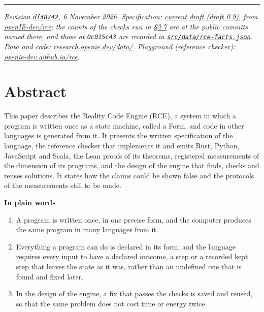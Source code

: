 \documentclass[10pt,letterpaper]{article}
\providecommand{\tightlist}{\setlength{\itemsep}{1pt}\setlength{\parskip}{0pt}}
\begin{document}
{
\small
\setcounter{tocdepth}{2}
\tableofcontents
}
\vspace{4pt}
\hrule
\vspace{8pt}

\emph{Revision
\href{https://github.com/openIE-dev/research-openie-web/commits/main/src/content/papers/rce.md}{\texttt{df38742}},
6 November 2026. Specification:
\href{https://research.openie.dev/rce/spec/}{current draft (draft 0.9)},
from \href{https://github.com/openIE-dev/rce}{openIE-dev/rce}; the
counts of the checks run in
\href{https://research.openie.dev/papers/rce/\#37-the-language-one-text-costs-and-theorem-status}{§3.7}
are at the public commits named there, and those at \texttt{0c015c43}
are recorded in
\href{https://github.com/openIE-dev/research-openie-web/blob/main/src/data/rce-facts.json}{\texttt{src/\allowbreak{}data/\allowbreak{}rce-\allowbreak{}facts.\allowbreak{}json}}.
Data and code:
\href{https://research.openie.dev/data/\#rce}{research.openie.dev/data/}.
Playground (reference checker):
\href{https://openie-dev.github.io/rce/}{openie-dev.github.io/rce}.}

\section{Abstract}\label{abstract}

This paper describes the Reality Code Engine (RCE), a system in which a
program is written once as a state machine, called a Form, and code in
other languages is generated from it. It presents the written
specification of the language, the reference checker that implements it
and emits Rust, Python, JavaScript and Scala, the Lean proofs of its
theorems, registered measurements of the dimension of its programs, and
the design of the engine that finds, checks and reuses solutions. It
states how the claims could be shown false and the protocols of the
measurements still to be made.

\textbf{In plain words}

\begin{enumerate}
\def\labelenumi{\arabic{enumi}.}
\tightlist
\item
  A program is written once, in one precise form, and the computer
  produces the same program in many languages from it.
\item
  Everything a program can do is declared in its form, and the language
  requires every input to have a declared outcome, a step or a recorded
  kept step that leaves the state as it was, rather than an undefined
  one that is found and fixed later.
\item
  In the design of the engine, a fix that passes the checks is saved and
  reused, so that the same problem does not cost time or energy twice.
\end{enumerate}
\end{document}
